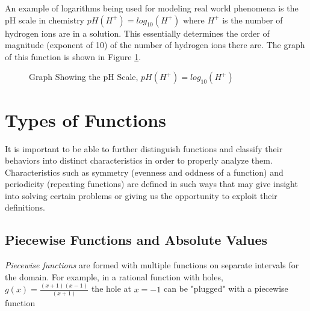         \begin{example}
            An example of logarithms being used for modeling real world phenomena is the pH scale in chemistry $pH(H^+) = log_{10}(H^+)$ where $H^+$ is the number of hydrogen ions are in a solution. This essentially determines the order of magnitude (exponent of 10) of the number of hydrogen ions there are. The graph of this function is shown in Figure \ref{fig:pHgraph}.

            \begin{figure}
                \centering
                \caption{Graph Showing the pH Scale, $pH(H^+) = log_{10}(H^+)$}
                \label{fig:pHgraph}
            \end{figure}

        \end{example}

        \section{Types of Functions}
        It is important to be able to further distinguish functions and classify their behaviors into distinct characteristics in order to properly analyze them. Characteristics such as symmetry (evenness and oddness of a function) and periodicity (repeating functions) are defined in such ways that may give insight into solving certain problems or giving us the opportunity to exploit their definitions.

        \subsection{Piecewise Functions and Absolute Values}
        \textit{Piecewise functions} are formed with multiple functions on separate intervals for the domain. For example, in a rational function with holes, $g(x) = \frac{(x+1)(x-1)}{(x+1)}$ the hole at $x = -1$ can be "plugged" with a piecewise function


